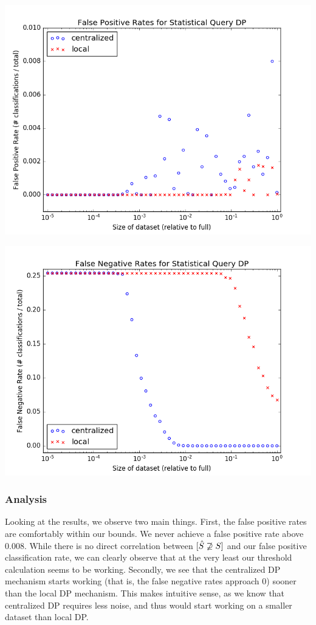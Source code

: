 \documentclass[12pt]{article}
\let\Pr\relax
\DeclareMathOperator*{\Pr}{\mathbb{P}}
\begin{document}
\includegraphics[scale=0.5]{false_positive_rate.png}

\includegraphics[scale=0.5]{false_negative_rate.png}

\subsubsection{Analysis}

\noindent

Looking at the results, we observe two main things. First, the false positive rates are comfortably within our bounds. We never achieve a false positive rate above 0.008. While there is no direct correlation between $\Pr[\hat{S} \not \supseteq S]$ and our false positive classification rate, we can clearly observe that at the very least our threshold calculation seems to be working. Secondly, we see that the centralized DP mechanism starts working (that is, the false negative rates approach 0) sooner than the local DP mechanism. This makes intuitive sense, as we know that centralized DP requires less noise, and thus would start working on a smaller dataset than local DP.
\end{document}
